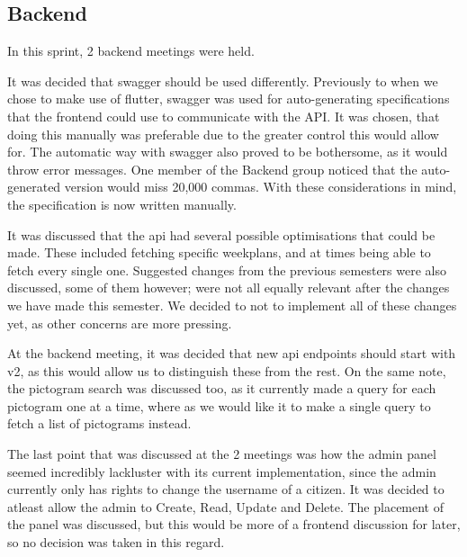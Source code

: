 \subsection{Backend}
In this sprint, 2 backend meetings were held.

It was decided that swagger should be used differently.
Previously to when we chose to make use of flutter, swagger was used for auto-generating specifications that the frontend could use to communicate with the API.
It was chosen, that doing this manually was preferable due to the greater control this would allow for.
The automatic way with swagger also proved to be bothersome, as it would throw error messages.
One member of the Backend group noticed that the auto-generated version would miss 20,000 commas.
With these considerations in mind, the specification is now written manually.

It was discussed that the api had several possible optimisations that could be made.
These included fetching specific weekplans, and at times being able to fetch every single one.
Suggested changes from the previous semesters were also discussed, some of them however; were not all equally relevant after the changes we have made this semester.
We decided to not to implement all of these changes yet, as other concerns are more pressing.

At the backend meeting, it was decided that new api endpoints should start with v2, as this would allow us to distinguish these from the rest.
On the same note, the pictogram search was discussed too, as it currently made a query for each pictogram one at a time, where as we would like it to make a single query to fetch a list of pictograms instead.

The last point that was discussed at the 2 meetings was how the admin panel seemed incredibly lackluster with its current implementation, since the admin currently only has rights to change the username of a citizen. It was decided to atleast allow the admin to Create, Read, Update and Delete. The placement of the panel was discussed, but this would be more of a frontend discussion for later, so no decision was taken in this regard.

